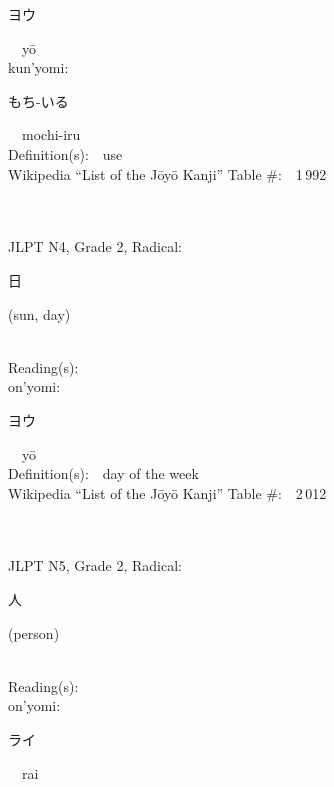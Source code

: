 \begin{multicols}{2}
{\hspace*{2em}}{\begin{CJK}{UTF8}{min} ヨウ \end{CJK}}\ \ y\=o\ \ \\
{\hspace*{1em}}kun'yomi:\ \ \\
{\hspace*{2em}}{\begin{CJK}{UTF8}{min} もち-いる \end{CJK}}\ \ mochi-iru\ \ \\
Definition(s):\ \ use \\
Wikipedia ``List of the J\=oy\=o Kanji'' Table \#:\ \ 1\,992 \\
\ \ \\
{\fontsize{34pt}{40pt}  }\ \ \\  %
{JLPT N4, Grade 2, Radical:\ \ {\begin{CJK}{UTF8}{min} 日 \end{CJK}} (sun, day) } \\
Reading(s):\ \ \\
{\hspace*{1em}}on'yomi:\ \ \\
{\hspace*{2em}}{\begin{CJK}{UTF8}{min} ヨウ \end{CJK}}\ \ y\=o\ \ \\
Definition(s):\ \ day of the week \\
Wikipedia ``List of the J\=oy\=o Kanji'' Table \#:\ \ 2\,012 \\
\ \ \\
{\fontsize{34pt}{40pt}  }\ \ \\  %
{JLPT N5, Grade 2, Radical:\ \ {\begin{CJK}{UTF8}{min} 人 \end{CJK}} (person) } \\
Reading(s):\ \ \\
{\hspace*{1em}}on'yomi:\ \ \\
{\hspace*{2em}}{\begin{CJK}{UTF8}{min} ライ \end{CJK}}\ \ rai\ \ \\

\end{multicols}
